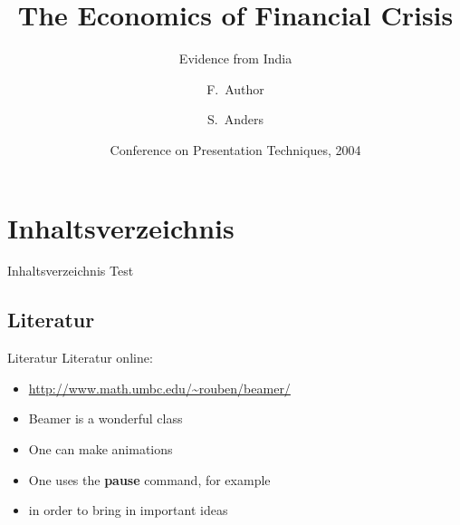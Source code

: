 \documentclass[10pt, a4paper]{beamer} %
\title[Crisis] %
{The Economics of Financial Crisis}
\subtitle{Evidence from India}
\author[Author, Anders] %
{F.~Author\inst{1} \and S.~Anders\inst{2}}
\institute[Universities Here and There] %
{
  \inst{1}%
  Institute of Computer Science\\
  University Here
  \and
  \inst{2}%
  Institute of Theoretical Philosophy\\
  University There
}
\date[KPT 2004] %
{Conference on Presentation Techniques, 2004}
\begin{document}
\begin{frame}
\titlepage
\end{frame}


\section{Inhaltsverzeichnis}
\begin{frame}{Inhaltsverzeichnis}
Test
\end{frame}


\subsection{Literatur}
\begin{frame}{Literatur}
Literatur online: 
\begin{itemize}
\item \url{http://www.math.umbc.edu/~rouben/beamer/}
\end{itemize}
\end{frame}

\begin{frame}

\begin{itemize}
\item Beamer is a wonderful class
\pause \item One can make animations
\pause \item One uses the \textbf{pause} command, for example
\pause \item in order to bring in important ideas
\end{itemize}

\end{frame}
\end{document}
